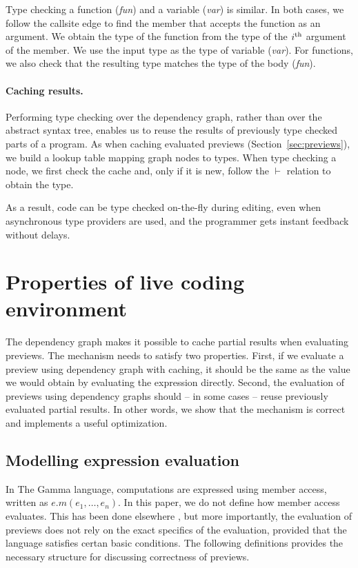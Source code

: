 \documentclass[sigplan,10pt,review,anonymous]{acmart}\settopmatter{printfolios=true,printccs=false,printacmref=false}
\theoremstyle{plain}
\theoremstyle{definition}
\newcommand{\blbl}[1]{\textnormal{\textcolor{numclr}{\sffamily #1}}}
\begin{document}
Type checking a function (\emph{fun}) and a variable (\emph{var}) is similar. In both cases,
we follow the \blbl{callsite} edge to find the member that accepts the function as an argument.
We obtain the type of the function from the type of the $i^\textnormal{th}$ argument of the 
member. We use the input type as the type of variable (\emph{var}). For functions, we also check 
that the resulting type matches the type of the body (\emph{fun}).

\paragraph{Caching results.}
Performing type checking over the dependency graph, rather than over the abstract syntax tree,
enables us to reuse the results of previously type checked parts of a program. As when 
caching evaluated previews (Section~\ref{sec:previews}), we build a lookup table mapping graph
nodes to types. When type checking a node, we first check the cache and, only if it is new, 
follow the $\vdash$ relation to obtain the type. 

As a result, code can be type checked on-the-fly during editing, even when asynchronous type 
providers are used, and the programmer gets instant feedback without delays.


\section{Properties of live coding environment}
\label{sec:properties}

The dependency graph makes it possible to cache partial results when evaluating previews. 
The mechanism needs to satisfy two properties.
First, if we evaluate a preview using dependency graph with caching, it should be the same as the
value we would obtain by evaluating the expression directly. Second, the evaluation of previews 
using dependency graphs should -- in some cases -- reuse previously evaluated partial results.
In other words, we show that the mechanism is correct and implements a useful optimization. 

\subsection{Modelling expression evaluation}
In The Gamma language, computations are expressed using
member access, written as $e.m(e_1,\ldots, e_n)$. In this paper, we do not define how member
access evaluates. This has been done elsewhere \cite{gamma}, but more importantly, the evaluation of
previews does not rely on the exact specifics of the evaluation, provided that the language
satisfies certan basic conditions. The following definitions provides the necessary structure 
for discussing correctness of previews.
\end{document}
